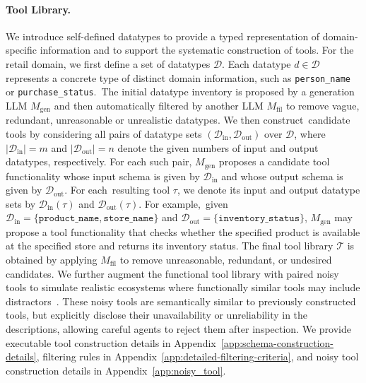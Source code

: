 \documentclass{llmxive}
\begin{document}
\paragraph{Tool Library.}
We introduce self-defined datatypes to provide a typed representation of domain-specific information and to support the systematic construction of tools.
For the retail domain, we first define a set of datatypes $\mathcal{D}$.
Each datatype $d \in \mathcal{D}$ represents a concrete type of distinct domain information, such as \texttt{person\_name} or \texttt{purchase\_status}.~The initial datatype inventory is proposed by a generation LLM $M_{\mathrm{gen}}$ and then automatically filtered by another LLM $M_{\mathrm{fil}}$ to remove vague, redundant, unreasonable or unrealistic datatypes. We then construct~candidate tools by considering all pairs of datatype sets $(\mathcal{D}_{\mathrm{in}}, \mathcal{D}_{\mathrm{out}})$ over $\mathcal{D}$, where $|\mathcal{D}_{\mathrm{in}}|{=}m$ and $|\mathcal{D}_{\mathrm{out}}|{=}n$ denote the given numbers of input and output datatypes, respectively.
For each such pair, $M_{\mathrm{gen}}$ proposes a candidate tool functionality whose input schema is given by $\mathcal{D}_{\mathrm{in}}$ and whose output schema is given by $\mathcal{D}_{\mathrm{out}}$.
For each~resulting tool $\tau$, we denote its input and output datatype sets by $\mathcal{D}_{\mathrm{in}}(\tau)$ and $\mathcal{D}_{\mathrm{out}}(\tau)$.
For example,~given
$\mathcal{D}_{\mathrm{in}}{=}\{\texttt{product\_name}, \texttt{store\_name}\}$
and
$\mathcal{D}_{\mathrm{out}}{=}\{\texttt{inventory\_status}\}$,
$M_{\mathrm{gen}}$ may propose a tool functionality that checks whether the specified product is available at the specified store and returns its inventory status. 
The final tool library $\mathcal{T}$ is obtained by applying $M_{\mathrm{fil}}$ to remove unreasonable, redundant, or undesired candidates. 
We further augment the functional tool library with paired noisy tools to simulate realistic ecosystems where functionally similar tools may include distractors~\citep{huang2024metatoolbenchmarklargelanguage}. These noisy tools are semantically similar to previously constructed tools, but explicitly disclose their unavailability or unreliability in the descriptions, allowing careful agents to reject them after inspection.
We provide executable tool construction details in Appendix~\ref{app:schema-construction-details}, filtering rules in Appendix~\ref{app:detailed-filtering-criteria}, and noisy tool construction details in Appendix~\ref{app:noisy_tool}.
\end{document}
